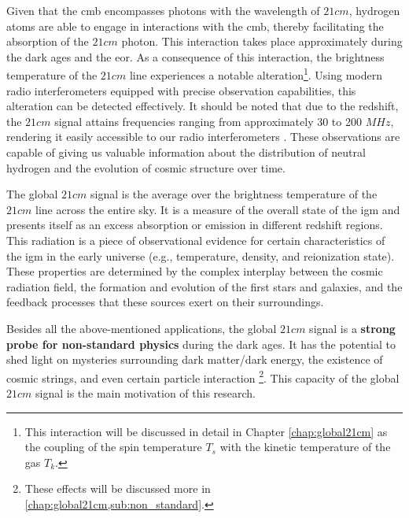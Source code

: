\documentclass[12pt, TexShade, letterpaper]{report}
\begin{document}
Given that the \gls{cmb} encompasses photons with the wavelength of $21cm$, hydrogen atoms are able to engage in interactions with the \gls{cmb}, thereby facilitating the absorption of the $21cm$ photon. This interaction takes place approximately during the dark ages and the \gls{eor}. As a consequence of this interaction, the brightness temperature of the $21cm$ line experiences a notable alteration\footnote{This interaction will be discussed in detail in Chapter \ref{chap:global21cm} as the coupling of the spin temperature $T_s$ with the kinetic temperature of the gas $T_k$.}. Using modern radio interferometers equipped with precise observation capabilities, this alteration can be detected effectively. It should be noted that due to the redshift, the $21cm$ signal attains frequencies ranging from approximately 30 to 200 $MHz$, rendering it easily accessible to our radio interferometers \cite{low_frequency}. These observations are capable of giving us valuable information about the distribution of neutral hydrogen and the evolution of cosmic structure over time\cite{low_frequency}.\par
The global $21cm$ signal is the average over the brightness temperature of the $21cm$ line across the entire sky. It is a measure of the overall state of the \gls{igm} and presents itself as an excess absorption or emission in different redshift regions. This radiation is a piece of observational evidence for certain characteristics of the \gls{igm} in the early universe (e.g., temperature, density, and reionization state). These properties are determined by the complex interplay between the cosmic radiation field, the formation and evolution of the first stars and galaxies, and the feedback processes that these sources exert on their surroundings\cite{21century}.\par
Besides all the above-mentioned applications, the global $21cm$ signal is a \textbf{strong probe for non-standard physics} during the dark ages. It has the potential to shed light on mysteries surrounding dark matter/dark energy, the existence of cosmic strings, and even certain particle interaction  \cite{dark_nature_21, constrain_dm_21, cosmic_string_brandenberger, ee_interaction_21, neutrino_21} \footnote{These effects will be discussed more in \ref{chap:global21cm,sub:non_standard}.}. This capacity of the global $21cm$ signal is the main motivation of this research.\par
\end{document}
